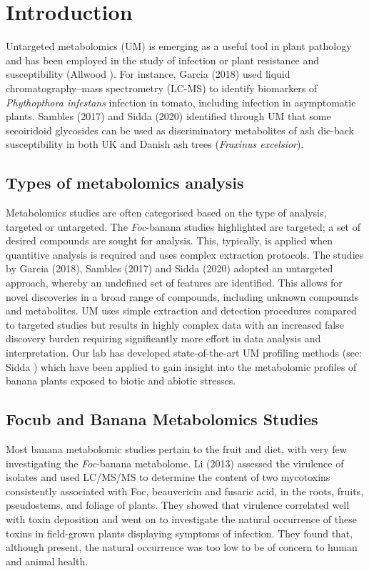 \section{Introduction}

Untargeted metabolomics (UM) is emerging as a useful tool in plant pathology and has been employed in the study of infection or plant resistance and susceptibility (Allwood ). For instance, Garcia \et (2018) used liquid chromatography–mass spectrometry (LC-MS) to identify biomarkers of \textit{Phythopthora infestans} infection in tomato, including infection in asymptomatic plants. Sambles \et  (2017) and Sidda \et (2020) identified through UM that some secoiridoid glycosides can be used as discriminatory metabolites of ash die-back susceptibility in both UK and Danish ash trees (\textit{Fraxinus excelsior}). 

\subsection{Types of metabolomics analysis}

Metabolomics studies are often categorised based on the type of analysis, targeted or untargeted. The \textit{Foc}-banana studies highlighted are targeted; a set of desired compounds are sought for analysis. This, typically, is applied when quantitive analysis is required and uses complex extraction protocols. The studies by Garcia \et (2018), Sambles \et  (2017) and Sidda \et (2020) adopted an untargeted approach, whereby an undefined set of features are identified. This allows for novel discoveries in a broad range of compounds, including unknown compounds and metabolites. UM uses simple extraction and detection procedures compared to targeted studies but results in highly complex data with an increased false discovery burden requiring significantly more effort in data analysis and interpretation. Our lab has developed state-of-the-art UM profiling methods (see: Sidda ) which have been applied to gain insight into the metabolomic profiles of banana plants exposed to biotic and abiotic stresses.

\subsection{\acl{Focub} and Banana Metabolomics Studies}

Most banana metabolomic studies pertain to the fruit and diet, with very few investigating the \textit{Foc}-banana metabolome. Li \et (2013) assessed the virulence of \Foc isolates and used LC/MS/MS to determine the content of two mycotoxins consistently associated with Foc, beauvericin and fusaric acid, in the roots, fruits, pseudostems, and foliage of plants. They showed that virulence correlated well with toxin deposition and went on to investigate the natural occurrence of these toxins in field-grown plants displaying symptoms of \Foc infection. They found that, although present, the natural occurrence was too low to be of concern to human and animal health. 

